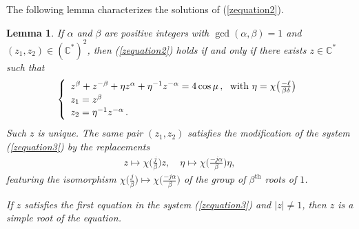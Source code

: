 \documentclass[12pt]{article}
\newtheorem{lemma}[theorem]{Lemma}
\newcommand{\CC}{\mathbb{C}}
\newcommand{\cchi}[1]{{\textstyle{\chi\big(#1\big)}}}
\begin{document}
The following lemma characterizes the solutions of (\ref{zequation2}).

\begin{lemma}\label{lemma:zequation}
If $\alpha$ and $\beta$ are positive integers with $\gcd(\alpha,\beta)=1$ and $(z_1,z_2)\in(\CC^*)^2$, then (\ref{zequation2}) holds if and only if there exists $z\in\CC^*$ such that
%
\begin{equation}\label{zequation3}
  \renewcommand{\arraystretch}{1.1}
\left\{
  \begin{array}{l}
    z^\beta + z^{-\beta} + \eta z^\alpha + \eta^{-1} z^{-\alpha} = 4\cos\mu\,,\; \text{ with } \eta=\cchi{\frac{-\ell}{\beta\delta}} \\
    z_1 = z^{\beta} \\
    z_2 = \eta^{-1} z^{-\alpha}\,.
  \end{array}
\right.
\end{equation}
%
Such $z$ is unique.  The same pair $(z_1,z_2)$ satisfies the modification of the system (\ref{zequation3}) by the replacements
%
\begin{eqnarray}
  z \mapsto \cchi{\frac{j}{\beta}}z,
  \quad
  \eta \mapsto \cchi{\frac{-j\alpha}{\beta}}\eta,
\end{eqnarray}
%
featuring the isomorphism $\cchi{\frac{j}{\beta}}\mapsto\cchi{\frac{-j\alpha}{\beta}}$ of the group of $\beta^\text{th}$ roots of $1$.

If $z$ satisfies the first equation in the system (\ref{zequation3}) and $|z|\not=1$, then $z$ is a simple root of the equation.
\end{lemma}
\end{document}
